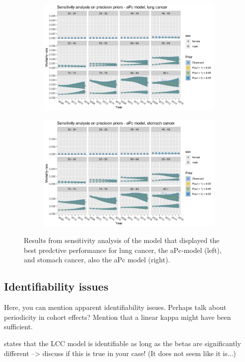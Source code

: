 \begin{figure}[h!]
    \centering
    \begin{subfigure}[b]{.45\linewidth}
        \includegraphics[width=\linewidth]{real-data/real-data-multivariate/Figures/sensitivity-analysis-aPc-by-period-lung.png}
    \end{subfigure}
    \begin{subfigure}[b]{.45\linewidth}
        \includegraphics[width=\linewidth]{real-data/real-data-multivariate/Figures/sensitivity-analysis-aPc-by-period-stomach.png}
    \end{subfigure}
    \caption{Results from sensitivity analysis of the model that displayed the best predctive performance for lung cancer, the aPc-model (left), and stomach cancer, also the aPc model (right). }
    \label{fig:mv-sensitivity}
\end{figure}

\newpage 
\subsection{Identifiability issues}
\textcolor{myDarkGreen}{
Here, you can mention apparent identifiability issues. Perhaps talk about periodicity in cohort effects? Mention that a linear kappa might have been sufficient. 

\parencite{Wisniowski2015} states that the LCC model is identifiable as long as the betas are significantly different --> discuss if this is true in your case! (It does not seem like it is...)
}

